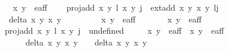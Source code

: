 \begin{isabellebody}
\ \ \ \ \ {\isachardoublequoteopen}{\isacharparenleft}x{}{\isacharcomma}\ y{}{\isacharparenright}\ {\isasymin}\ e{\isacharprime}{\isacharunderscore}aff{\isachardoublequoteclose}\ \isanewline
\ \ {\isacharbar}\ {\isachardoublequoteopen}proj{\isacharunderscore}add\ {\isacharparenleft}{\isacharparenleft}x{}{\isacharcomma}\ y{}{\isacharparenright}{\isacharcomma}\ l{\isacharparenright}\ {\isacharparenleft}{\isacharparenleft}x{}{\isacharcomma}\ y{}{\isacharparenright}{\isacharcomma}\ j{\isacharparenright}\ {\isacharequal}\ {\isacharparenleft}ext{\isacharunderscore}add\ {\isacharparenleft}x{}{\isacharcomma}\ y{}{\isacharparenright}\ {\isacharparenleft}x{}{\isacharcomma}\ y{}{\isacharparenright}{\isacharcomma}\ l{\isacharplus}j{\isacharparenright}{\isachardoublequoteclose}\isanewline
\ \ \ \ {\isachardoublequoteopen}delta{\isacharprime}\ x{}\ y{}\ x{}\ y{}\ {\isasymnoteq}\ {}{\isachardoublequoteclose}\ \ \isanewline
\ \ \ \ \ {\isachardoublequoteopen}{\isacharparenleft}x{}{\isacharcomma}\ y{}{\isacharparenright}\ {\isasymin}\ e{\isacharprime}{\isacharunderscore}aff{\isachardoublequoteclose}\ \ \isanewline
\ \ \ \ \ {\isachardoublequoteopen}{\isacharparenleft}x{}{\isacharcomma}\ y{}{\isacharparenright}\ {\isasymin}\ e{\isacharprime}{\isacharunderscore}aff{\isachardoublequoteclose}\isanewline
\ \ {\isacharbar}\ {\isachardoublequoteopen}proj{\isacharunderscore}add\ {\isacharparenleft}{\isacharparenleft}x{}{\isacharcomma}\ y{}{\isacharparenright}{\isacharcomma}\ l{\isacharparenright}\ {\isacharparenleft}{\isacharparenleft}x{}{\isacharcomma}\ y{}{\isacharparenright}{\isacharcomma}\ j{\isacharparenright}\ {\isacharequal}\ undefined{\isachardoublequoteclose}\ \isanewline
\ \ \ \ {\isachardoublequoteopen}{\isacharparenleft}x{}{\isacharcomma}\ y{}{\isacharparenright}\ {\isasymnotin}\ e{\isacharprime}{\isacharunderscore}aff\ {\isasymor}\ {\isacharparenleft}x{}{\isacharcomma}\ y{}{\isacharparenright}\ {\isasymnotin}\ e{\isacharprime}{\isacharunderscore}aff\ {\isasymor}\ \isanewline
\ \ \ \ \ \ \ \ {\isacharparenleft}delta\ x{}\ y{}\ x{}\ y{}\ {\isacharequal}\ {}\ {\isasymand}\ delta{\isacharprime}\ x{}\ y{}\ x{}\ y{}\ {\isacharequal}\ {}{\isacharparenright}{\isachardoublequoteclose}\isanewline

\end{isabellebody}
